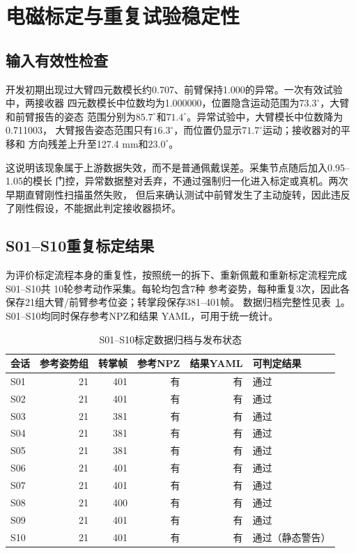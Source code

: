 \section{电磁标定与重复试验稳定性}
\label{sec:ch7_calibration_repeatability}

\subsection{输入有效性检查}
\label{subsec:ch7_input_validity}

开发初期出现过大臂四元数模长约0.707、前臂保持1.000的异常。一次有效试验中，两接收器
四元数模长中位数均为1.000000，位置隐含运动范围为$73.3^\circ$，大臂和前臂报告的姿态
范围分别为$85.7^\circ$和$71.4^\circ$。异常试验中，大臂模长中位数降为0.711003，
大臂报告姿态范围只有$16.3^\circ$，而位置仍显示$71.7^\circ$运动；接收器对的平移和
方向残差上升至127.4 mm和$23.0^\circ$。

这说明该现象属于上游数据失效，而不是普通佩戴误差。采集节点随后加入0.95--1.05的模长
门控，异常数据整对丢弃，不通过强制归一化进入标定或真机。两次早期直臂刚性扫描虽然失败，
但后来确认测试中前臂发生了主动旋转，因此违反了刚性假设，不能据此判定接收器损坏。

\subsection{S01--S10重复标定结果}
\label{subsec:ch7_calibration_snapshot}

为评价标定流程本身的重复性，按照统一的拆下、重新佩戴和重新标定流程完成S01--S10共
10轮参考动作采集。每轮均包含7种
参考姿势，每种重复3次，因此各保存21组大臂/前臂参考位姿；转掌段保存381--401帧。
数据归档完整性见表~\ref{tab:ch7_calibration_archive}。S01--S10均同时保存参考NPZ和结果
YAML，可用于统一统计。

\begin{table}[htbp]
  \centering
  \small
  \caption{S01--S10标定数据归档与发布状态}
  \label{tab:ch7_calibration_archive}
  \begin{tabular}{@{}lrrrrl@{}}
    \toprule
    会话 & 参考姿势组 & 转掌帧 & 参考NPZ & 结果YAML & 可判定结果 \\
    \midrule
    S01 & 21 & 401 & 有 & 有 & 通过 \\
    S02 & 21 & 401 & 有 & 有 & 通过 \\
    S03 & 21 & 381 & 有 & 有 & 通过 \\
    S04 & 21 & 381 & 有 & 有 & 通过 \\
    S05 & 21 & 381 & 有 & 有 & 通过 \\
    S06 & 21 & 401 & 有 & 有 & 通过 \\
    S07 & 21 & 401 & 有 & 有 & 通过 \\
    S08 & 21 & 400 & 有 & 有 & 通过 \\
    S09 & 21 & 401 & 有 & 有 & 通过 \\
    S10 & 21 & 401 & 有 & 有 & 通过（静态警告） \\
    \bottomrule
  \end{tabular}
\end{table}

